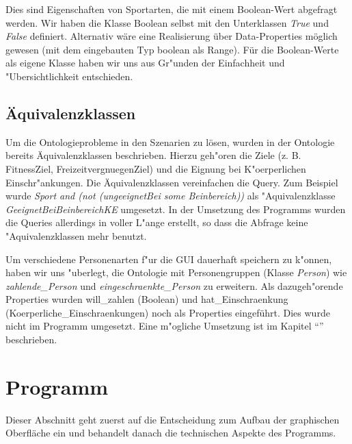 Dies sind Eigenschaften von Sportarten, die mit einem Boolean-Wert abgefragt werden. Wir haben die Klasse Boolean selbst mit den Unterklassen \textit{True} und \textit{False} definiert. Alternativ w\"are eine Realisierung \"uber Data-Properties m\"oglich gewesen (mit dem eingebauten Typ boolean als Range). Für die Boolean-Werte als eigene Klasse haben wir uns aus Gr"unden der Einfachheit und "Ubersichtlichkeit entschieden. 

\subsection{\"Aquivalenzklassen}

Um die Ontologieprobleme in den Szenarien zu l\"osen, wurden in der Ontologie bereits \"Aquivalenzklassen beschrieben. 
Hierzu geh"oren die Ziele (z. B. FitnessZiel, FreizeitvergnuegenZiel) und die Eignung bei K"oerperlichen Einschr"ankungen.
Die Äquivalenzklassen vereinfachen die Query. Zum Beispiel wurde \textit{Sport and (not (ungeeignetBei some Beinbereich))} als "Aquivalenzklasse \textit{GeeignetBeiBeinbereichKE} umgesetzt. In der Umsetzung des Programms wurden die Queries allerdings in voller L"ange erstellt, so dass die Abfrage keine "Aquivalenzklassen mehr benutzt. 


Um verschiedene Personenarten f"ur die GUI dauerhaft speichern zu k"onnen, haben wir uns "uberlegt, die Ontologie mit Personengruppen (Klasse \textit{Person}) wie \textit{zahlende\_Person} und \textit{eingeschraenkte\_Person} zu erweitern. Als dazugeh"orende Properties wurden will\_zahlen (Boolean) und hat\_Einschraenkung (Koerperliche\_Einschraenkungen) noch als Properties eingeführt. Dies wurde nicht im Programm umgesetzt. Eine m"ogliche Umsetzung ist im Kapitel "`"' beschrieben.

\section{Programm}

Dieser Abschnitt geht zuerst auf die Entscheidung zum Aufbau der graphischen Oberfl\"ache ein und behandelt danach die technischen Aspekte des Programms. 


